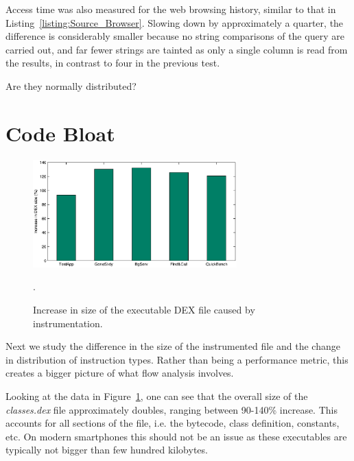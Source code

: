 \documentclass[12pt,twoside,notitlepage]{report}
\begin{document}
Access time was also measured for the web browsing history, similar to that in Listing~\ref{listing:Source_Browser}. Slowing down by approximately a quarter, the difference is considerably smaller because no string comparisons of the query are carried out, and far fewer strings are tainted as only a single column is read from the results, in contrast to four in the previous test.

Are they normally distributed?

\section{Code Bloat}

\begin{figure}
	\centerline{
		\includegraphics[width=0.7\textwidth]{figs/fig_eval_filesize.eps}
	}
	\caption{Increase in size of the executable DEX file caused by instrumentation.}.
	\label{figure:Evalutaion_FileSize}
\end{figure}

Next we study the difference in the size of the instrumented file and the change in distribution of instruction types. Rather than being a performance metric, this creates a bigger picture of what flow analysis involves.

Looking at the data in Figure~\ref{figure:Evalutaion_FileSize}, one can see that the overall size of the \emph{classes.dex} file approximately doubles, ranging between 90-140\% increase. This accounts for all sections of the file, i.e. the bytecode, class definition, constants, etc. On modern smartphones this should not be an issue as these executables are typically not bigger than few hundred kilobytes.
\end{document}
